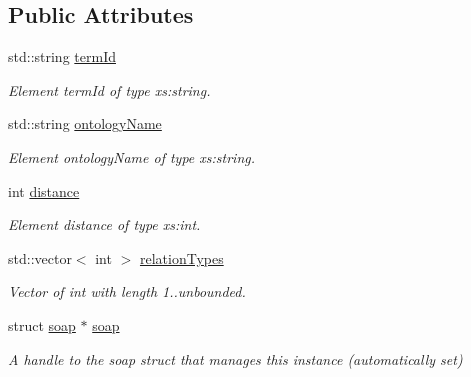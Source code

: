 \subsection*{Public Attributes}
\begin{DoxyCompactItemize}
\item 
std::string \hyperlink{class__ns1____getTermChildren_a07b100ba1140aa637de26081c8ab7c91}{termId}
\begin{DoxyCompactList}\small\item\em Element termId of type xs:string. \end{DoxyCompactList}\item 
std::string \hyperlink{class__ns1____getTermChildren_a3c14c7148d11af2edf3e1f5bf90c2356}{ontologyName}
\begin{DoxyCompactList}\small\item\em Element ontologyName of type xs:string. \end{DoxyCompactList}\item 
int \hyperlink{class__ns1____getTermChildren_a0c3c54ed32733eeb833d01aa85867fd1}{distance}
\begin{DoxyCompactList}\small\item\em Element distance of type xs:int. \end{DoxyCompactList}\item 
\hypertarget{class__ns1____getTermChildren_aea6b9e45e9ea80c76fc0a7dfd4e4dc76}{
std::vector$<$ int $>$ \hyperlink{class__ns1____getTermChildren_aea6b9e45e9ea80c76fc0a7dfd4e4dc76}{relationTypes}}
\label{class__ns1____getTermChildren_aea6b9e45e9ea80c76fc0a7dfd4e4dc76}

\begin{DoxyCompactList}\small\item\em Vector of int with length 1..unbounded. \end{DoxyCompactList}\item 
\hypertarget{class__ns1____getTermChildren_acd80335f29f7dedeac3a5cdb2c020816}{
struct \hyperlink{class__ns1____getTermChildren_acd80335f29f7dedeac3a5cdb2c020816}{soap} $\ast$ \hyperlink{class__ns1____getTermChildren_acd80335f29f7dedeac3a5cdb2c020816}{soap}}
\label{class__ns1____getTermChildren_acd80335f29f7dedeac3a5cdb2c020816}

\begin{DoxyCompactList}\small\item\em A handle to the soap struct that manages this instance (automatically set) \end{DoxyCompactList}\end{DoxyCompactItemize}



